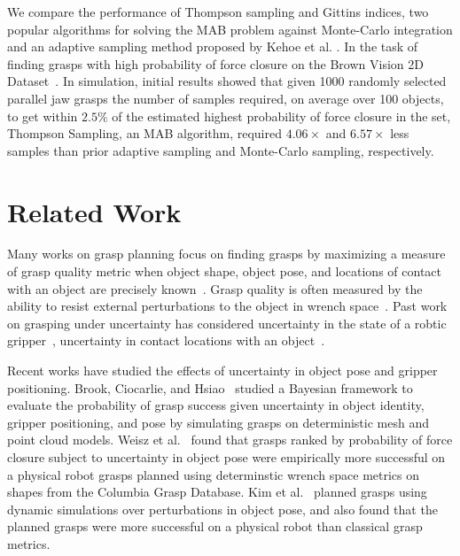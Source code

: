 \documentclass[a4paper, 10pt, conference]{ieeeconf}      %
\begin{document}
We compare the performance of Thompson sampling and Gittins indices, two popular algorithms for solving the MAB problem against Monte-Carlo integration and an adaptive sampling method proposed by Kehoe et al. \cite{kehoe2012toward}. In the task of finding grasps with high probability of force closure on the Brown Vision 2D Dataset~\cite{brown, christopoulos2007handling}.
In simulation, initial results  showed that given 1000 randomly selected parallel jaw grasps the number of samples required, on average over 100 objects, to get within $2.5\%$ of the estimated highest probability of force closure in the set, Thompson Sampling, an MAB algorithm, required $4.06\times$ and $6.57\times$ less samples than prior adaptive sampling and Monte-Carlo sampling, respectively. 


\section{Related Work}

Many works on grasp planning focus on finding grasps by maximizing a measure of grasp quality metric when object shape, object pose, and locations of contact with an object are precisely known~\cite{cheong2011output, ciocarlie2009}.
Grasp quality is often measured by the ability to resist external perturbations to the object in wrench space~\cite{ferrari1992, miller2004graspit}.
Past work on grasping under uncertainty has considered uncertainty in the state of a robtic gripper~\cite{goldberg1990bayesian, stulp2011learning}, uncertainty in contact locations with an object~\cite{zheng2005}.

Recent works have studied the effects of uncertainty in object pose and gripper positioning.%
Brook, Ciocarlie, and Hsiao~\cite{brook2011collaborative, hsiao2011bayesian} studied a Bayesian framework to evaluate the probability of grasp success given uncertainty in object identity, gripper positioning, and pose by simulating grasps on deterministic mesh and point cloud models.
Weisz et al.~\cite{weisz2012pose} found that grasps ranked by probability of force closure subject to uncertainty in object pose were empirically more successful on a physical robot grasps planned using determinstic wrench space metrics on shapes from the Columbia Grasp Database.
Kim et al.~\cite{kim2012physically} planned grasps using dynamic simulations over perturbations in object pose, and also found that the planned grasps were more successful on a physical robot than classical grasp metrics.
\end{document}
